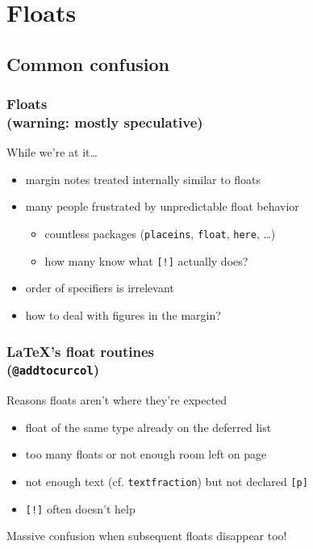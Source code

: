 \documentclass{beamer}
\def\cs#1{\texttt{\expandafter\string\csname#1\endcsname}}
\begin{document}
\section{Floats}
\subsection{Common confusion}
\begin{frame}
  \frametitle{Floats\\\normalsize(warning: mostly speculative)}
  \begin{block}{While we're at it\ldots}
    \begin{itemize}
    \item margin notes treated internally similar to floats
    \item many people frustrated by unpredictable float behavior
      \begin{itemize}
      \item countless packages (\texttt{placeins}, \texttt{float},
        \texttt{here}, \ldots)
      \item how many know what \texttt{[!]} actually does?
      \end{itemize}
    \item order of specifiers is irrelevant
    \item how to deal with figures in the margin?
    \end{itemize}
  \end{block}
\end{frame}

\begin{frame}
  \frametitle{\LaTeX's float routines\\\normalsize(\cs{@addtocurcol})}
  \begin{block}{Reasons floats aren't where they're expected}
    \begin{itemize}
    \item float of the same type already on the deferred list
    \item too many floats or not enough room left on page
    \item not enough text (cf. \cs{textfraction}) but not declared \texttt{[p]}
    \item \texttt{[!]} often doesn't help
    \end{itemize}
  \end{block}
  \vskip 2pc
  Massive confusion when subsequent floats disappear too!
\end{frame}
\end{document}
